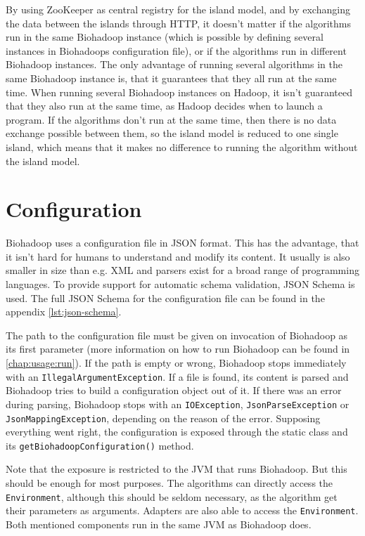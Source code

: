     By using ZooKeeper as central registry for the island model, and by exchanging the data between the islands through HTTP, it doesn't matter if the algorithms run in the same Biohadoop instance (which is possible by defining several instances in Biohadoops configuration file), or if the algorithms run in different Biohadoop instances. The only advantage of running several algorithms in the same Biohadoop instance is, that it guarantees that they all run at the same time. When running several Biohadoop instances on Hadoop, it isn't guaranteed that they also run at the same time, as Hadoop decides when to launch a program. If the algorithms don't run at the same time, then there is no data exchange possible between them, so the island model is reduced to one single island, which means that it makes no difference to running the algorithm without the island model.
  
\section{Configuration}
\label{chap:impl:configuration}
  Biohadoop uses a configuration file in JSON format. This has the advantage, that it isn't hard for humans to understand and modify its content. It usually is also smaller in size than e.g. XML and parsers exist for a broad range of programming languages. To provide support for automatic schema validation, JSON Schema \cite{json-schema} is used. The full JSON Schema \cite{json-schema} for the configuration file can be found in the appendix \ref{lst:json-schema}.
  
  The path to the configuration file must be given on invocation of Biohadoop as its first parameter (more information on how to run Biohadoop can be found in \ref{chap:usage:run}). If the path is empty or wrong, Biohadoop stops immediately with an \texttt{IllegalArgumentException}. If a file is found, its content is parsed and Biohadoop tries to build a configuration object out of it. If there was an error during parsing, Biohadoop stops with an \texttt{IOException}, \texttt{JsonParseException} or \texttt{JsonMappingException}, depending on the reason of the error. Supposing everything went right, the configuration is exposed through the static class  and its \texttt{getBiohadoopConfiguration()} method.
  
  Note that the exposure is restricted to the JVM that runs Biohadoop. But this should be enough for most purposes. The algorithms can directly access the \texttt{Environment}, although this should be seldom necessary, as the algorithm get their parameters as arguments. Adapters are also able to access the \texttt{Environment}. Both mentioned components run in the same JVM as Biohadoop does.
  
